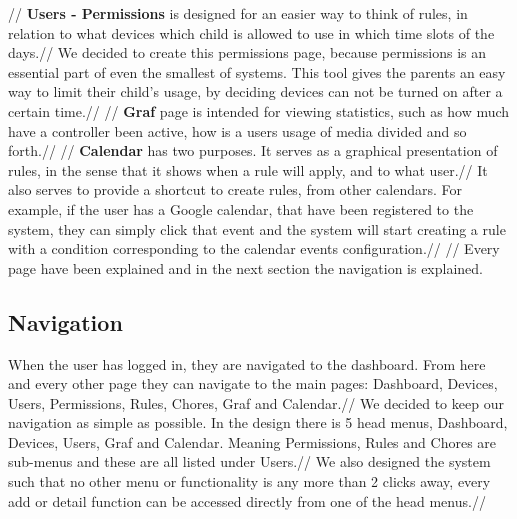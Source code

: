 //
\textbf{Users - Permissions} is designed for an easier way to think of rules, in relation to what devices which child is allowed to use in which time slots of the days.//
We decided to create this permissions page, because permissions is an essential part of even the smallest of systems. This tool gives the parents an easy way to limit their child’s usage, by deciding devices can not be turned on after a certain time.//
//
\textbf{Graf} page is intended for viewing statistics, such as how much have a controller been active, how is a users usage of media divided and so forth.//
//
\textbf{Calendar} has two purposes. It serves as a graphical presentation of rules, in the sense that it shows when a rule will apply, and to what user.//
It also serves to provide a shortcut to create rules, from other calendars. For example, if the user has a Google calendar, that have been registered to the system, they can simply click that event and the system will start creating a rule with a condition corresponding to the calendar events configuration.//
//
Every page have been explained and in the next section the navigation is explained.
\subsection{Navigation}
When the user has logged in, they are navigated to the dashboard. From here and every other page they can navigate to the main pages: Dashboard, Devices, Users, Permissions, Rules, Chores, Graf and Calendar.//
We decided to keep our navigation as simple as possible. In the design there is 5 head menus, Dashboard, Devices, Users, Graf and Calendar. Meaning Permissions, Rules and Chores are sub-menus and these are all listed under Users.//
We also designed the system such that no other menu or functionality is any more than 2 clicks away, every add or detail function can be accessed directly from one of the head menus.//

